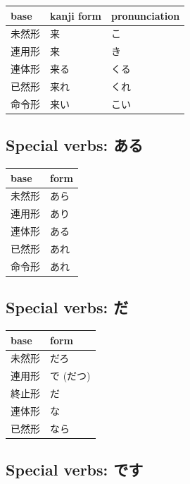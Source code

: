 \documentclass[11pt, b5paper, twoside, openright, onecolumn]{book}
\newenvironment{mytabular}[1]{\noindent\hspace{0.4in}
\begin{tabular}[h]{#1}}{\end{tabular}}
\begin{document}
\smaller
\begin{mytabular}{| l  l  l |}\hline 
\rule{0pt}{2.4ex}base & kanji form & pronunciation\\ 
\hline
\rule{0pt}{2.4ex}未然形 & 来 & こ\\ 
\rule{0pt}{2.4ex}連用形 & 来 & き\\ 
\rule{0pt}{2.4ex}連体形 & 来る & くる\\ 
\rule{0pt}{2.4ex}已然形 & 来れ & くれ\\ 
\rule{0pt}{2.4ex}命令形 & 来い & こい\\ 
\hline 
\end{mytabular}
\larger

\subsection{Special verbs: ある}

\smaller
\begin{mytabular}{| l  l |}\hline 
\rule{0pt}{2.4ex}base & form\\ 
\hline
\rule{0pt}{2.4ex}未然形 & あら\\ 
\rule{0pt}{2.4ex}連用形 & あり\\ 
\rule{0pt}{2.4ex}連体形 & ある\\ 
\rule{0pt}{2.4ex}已然形 & あれ\\ 
\rule{0pt}{2.4ex}命令形 & あれ\\ 
\hline 
\end{mytabular}
\larger

\subsection{Special verbs: だ}

\smaller
\begin{mytabular}{| l  l |}\hline 
\rule{0pt}{2.4ex}base & form\\ 
\hline
\rule{0pt}{2.4ex}未然形 & だろ\\ 
\rule{0pt}{2.4ex}連用形 & で (だつ)\\ 
\rule{0pt}{2.4ex}終止形 & だ\\ 
\rule{0pt}{2.4ex}連体形 & な\\ 
\rule{0pt}{2.4ex}已然形 & なら\\ 
\hline 
\end{mytabular}
\larger

\subsection{Special verbs: です}
\end{document}
